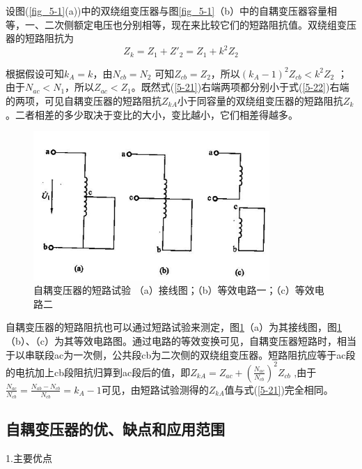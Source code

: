 \documentclass{book}
\begin{document}
设图(\ref{fig_5-1}(a))中的双绕组变压器与图\ref{fig_5-1}（b）中的自耦变压器容量相等，一、二次侧额定电压也分别相等，现在来比较它们的短路阻抗值。双绕组变压器的短路阻抗为
\begin{equation}
{{Z}_{k}}={{Z}_{1}}+{{{Z}'}_{2}}={{Z}_{1}}+{{k}^{2}}{{Z}_{2}}
\label{5-22}
\end{equation}

根据假设可知${{k}_{A}}=k$，由${{N}_{cb}}={{N}_{2}}$ 可知${{Z}_{cb}}={{Z}_{2}}$，所以${{\left( {{k}_{A}}-1 \right)}^{2}}{{Z}_{cb}}<{{k}^{2}}{{Z}_{2}}$ ；由于${{N}_{ac}}<{{N}_{1}}$，所以${{Z}_{ac}}<{{Z}_{1}}$。既然式(\ref{5-21})右端两项都分别小于式(\ref{5-22})右端的两项，可见自耦变压器的短路阻抗${{Z}_{kA}}$小于同容量的双绕组变压器的短路阻抗${{Z}_{k}}$。二者相差的多少取决于变比的大小，变比越小，它们相差得越多。

\begin{figure}[H]
	\centering
	\includegraphics[width=0.80\textwidth]{5-5.png}
	\caption{自耦变压器的短路试验
		（a）接线图；（b）等效电路一；（c）等效电路二}
	\label{fig_5-5}
\end{figure}
自耦变压器的短路阻抗也可以通过短路试验来测定，图\ref{fig_5-5}（a）为其接线图，图\ref{fig_5-5}（b）、（c）为其等效电路图。通过电路的等效变换可见，自耦变压器短路时，相当于以串联段ac为一次侧，公共段cb为二次侧的双绕组变压器。短路阻抗应等于ac段的电抗加上cb段阻抗归算到ac段后的值，即${{Z}_{kA}}={{Z}_{ac}}+{{\left( \frac{{{N}_{ac}}}{{{N}_{cb}}} \right)}^{2}}{{Z}_{cb}}$ ,由于$\frac{{{N}_{ac}}}{{{N}_{cb}}}=\frac{{{N}_{ab}}-{{N}_{cb}}}{{{N}_{cb}}}={{k}_{A}}-1$可见，由短路试验测得的${{Z}_{kA}}$值与式(\ref{5-21})完全相同。

\subsection{自耦变压器的优、缺点和应用范围}

1.主要优点
\end{document}
